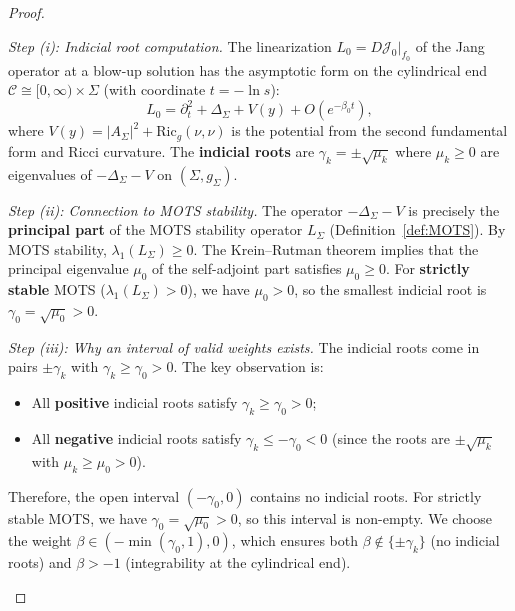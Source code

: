 \documentclass[12pt]{article}
\theoremstyle{plain}
\theoremstyle{definition}
\theoremstyle{remark}
\newcommand{\Ric}{\mathrm{Ric}}
\begin{document}
\begin{proof}
\begin{itemize}
    \textit{Step (i): Indicial root computation.} The linearization $L_0 = D\mathcal{J}_0|_{f_0}$ of the Jang operator at a blow-up solution has the asymptotic form on the cylindrical end $\mathcal{C} \cong [0,\infty) \times \Sigma$ (with coordinate $t = -\ln s$):
    \[
    L_0 = \partial_t^2 + \Delta_\Sigma + V(y) + O(e^{-\beta_0 t}),
    \]
    where $V(y) = |A_\Sigma|^2 + \Ric_g(\nu,\nu)$ is the potential from the second fundamental form and Ricci curvature. The \textbf{indicial roots} are $\gamma_k = \pm\sqrt{\mu_k}$ where $\mu_k \geq 0$ are eigenvalues of $-\Delta_\Sigma - V$ on $(\Sigma, g_\Sigma)$.
    
    \textit{Step (ii): Connection to MOTS stability.} The operator $-\Delta_\Sigma - V$ is precisely the \textbf{principal part} of the MOTS stability operator $L_\Sigma$ (Definition~\ref{def:MOTS}). By MOTS stability, $\lambda_1(L_\Sigma) \geq 0$. The Krein--Rutman theorem implies that the principal eigenvalue $\mu_0$ of the self-adjoint part satisfies $\mu_0 \geq 0$. For \textbf{strictly stable} MOTS ($\lambda_1(L_\Sigma) > 0$), we have $\mu_0 > 0$, so the smallest indicial root is $\gamma_0 = \sqrt{\mu_0} > 0$.
    
    \textit{Step (iii): Why an interval of valid weights exists.} The indicial roots come in pairs $\pm\gamma_k$ with $\gamma_k \geq \gamma_0 > 0$. The key observation is:
    \begin{itemize}
        \item All \textbf{positive} indicial roots satisfy $\gamma_k \geq \gamma_0 > 0$;
        \item All \textbf{negative} indicial roots satisfy $\gamma_k \leq -\gamma_0 < 0$ (since the roots are $\pm\sqrt{\mu_k}$ with $\mu_k \geq \mu_0 > 0$).
    \end{itemize}
    Therefore, the open interval $(-\gamma_0, 0)$ contains no indicial roots. For strictly stable MOTS, we have $\gamma_0 = \sqrt{\mu_0} > 0$, so this interval is non-empty. We choose the weight $\beta \in (-\min(\gamma_0, 1), 0)$, which ensures both $\beta \notin \{\pm\gamma_k\}$ (no indicial roots) and $\beta > -1$ (integrability at the cylindrical end).
    

\end{itemize}
\end{proof}
\end{document}

